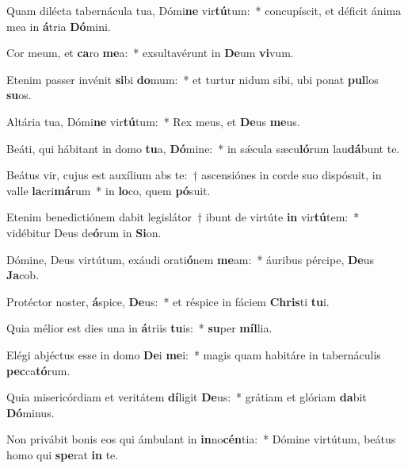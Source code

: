 \item Quam dilécta tabernácula tua, Dómi\textbf{ne} vir\textbf{tú}tum:~* concupíscit, et déficit ánima mea in \textbf{á}tria \textbf{Dó}mini.
\item Cor meum, et \textbf{ca}ro \textbf{me}a:~* exsultavérunt in \textbf{De}um \textbf{vi}vum.
\item Etenim passer invénit \textbf{si}bi \textbf{do}mum:~* et turtur nidum sibi, ubi ponat \textbf{pul}los \textbf{su}os.
\item Altária tua, Dómi\textbf{ne} vir\textbf{tú}tum:~* Rex meus, et \textbf{De}us \textbf{me}us.
\item Beáti, qui hábitant in domo \textbf{tu}a, \textbf{Dó}mine:~* in sǽcula sæcu\textbf{ló}rum lau\textbf{dá}bunt te.
\item Beátus vir, cujus est auxílium abs te:~† ascensiónes in corde suo dispósuit, in valle \textbf{la}cri\textbf{má}rum~* in \textbf{lo}co, quem \textbf{pó}suit.
\item Etenim benedictiónem dabit legislátor~† ibunt de virtúte \textbf{in} vir\textbf{tú}tem:~* vidébitur Deus de\textbf{ó}rum in \textbf{Si}on.
\item Dómine, Deus virtútum, exáudi orati\textbf{ó}nem \textbf{me}am:~* áuribus pércipe, \textbf{De}us \textbf{Ja}cob.
\item Protéctor noster, \textbf{á}spice, \textbf{De}us:~* et réspice in fáciem \textbf{Chris}ti \textbf{tu}i.
\item Quia mélior est dies una in \textbf{á}triis \textbf{tu}is:~* \textbf{su}per \textbf{míl}lia.
\item Elégi abjéctus esse in domo \textbf{De}i \textbf{me}i:~* magis quam habitáre in tabernáculis \textbf{pec}ca\textbf{tó}rum.
\item Quia misericórdiam et veritátem \textbf{dí}ligit \textbf{De}us:~* grátiam et glóriam \textbf{da}bit \textbf{Dó}minus.
\item Non privábit bonis eos qui ámbulant in \textbf{in}no\textbf{cén}tia:~* Dómine virtútum, beátus homo qui \textbf{spe}rat \textbf{in} te.
